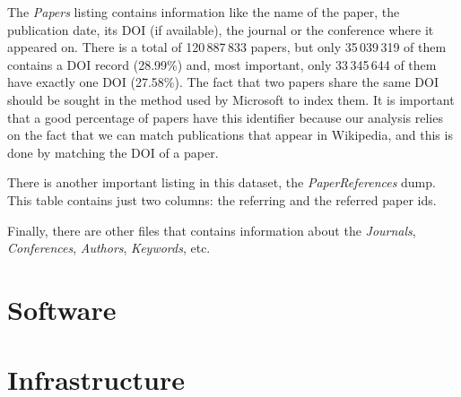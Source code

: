 The \emph{Papers} listing contains information like the name of the paper, the publication date, its \ac{DOI} (if available), the journal or the conference where it appeared on.
There is a total of 120\,887\,833 papers, but only 35\,039\,319 of them contains a \ac{DOI} record (28.99\%) and, most important, only 33\,345\,644 of them have exactly one \ac{DOI} (27.58\%).
The fact that two papers share the same \ac{DOI} should be sought in the method used by Microsoft to index them.
It is important that a good percentage of papers have this identifier because our analysis relies on the fact that we can match publications that appear in Wikipedia, and this is done by matching the \ac{DOI} of a paper.

There is another important listing in this dataset, the \emph{PaperReferences} dump.
This table contains just two columns: the referring and the referred paper ids.

Finally, there are other files that contains information about the \emph{Journals}, \emph{Conferences}, \emph{Authors}, \emph{Keywords}, etc.




\section{Software}
\label{sec:software}


\section{Infrastructure}
\label{sec:infrastructure}
